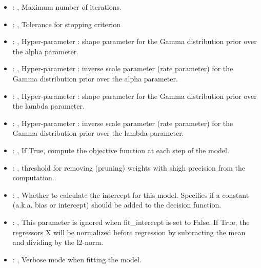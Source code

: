 \begin{itemize}
    \item {}: , 
      Maximum number of iterations.

    \item {}: , 
      Tolerance for stopping criterion

    \item {}: , 
      Hyper-parameter : shape parameter for the Gamma
      distribution prior over the alpha parameter.

    \item {}: , 
      Hyper-parameter : inverse scale parameter (rate parameter)
      for the Gamma distribution prior over the alpha parameter.

    \item {}: , 
      Hyper-parameter : shape parameter for the Gamma distribution
      prior over the lambda parameter.

    \item {}: , 
      Hyper-parameter : inverse scale parameter (rate parameter) for
      the Gamma distribution prior over the lambda parameter.

    \item {}: , 
      If True, compute the objective function at each step of the
      model.

    \item {}: , 
      threshold for removing (pruning) weights with
      shigh precision from the computation..

    \item {}: , 
      Whether to calculate the intercept for this model. Specifies if a constant (a.k.a. bias or
      intercept)                                                   should be added to the decision
      function.

    \item {}: , 
      This parameter is ignored when fit\_intercept is set to False. If True,
      the regressors X will be normalized before regression by subtracting the mean and
      dividing by the l2-norm.

    \item {}: , 
      Verbose mode when fitting the model.
  \end{itemize}


